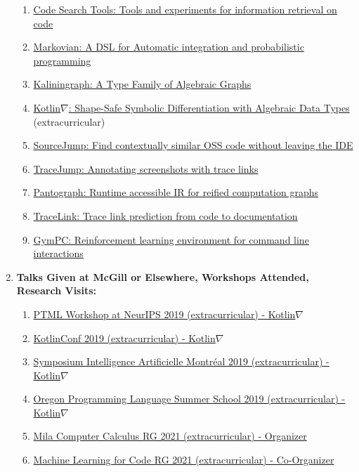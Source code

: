 \documentclass[11pt]{article}
\begin{document}
\begin{enumerate}
        \begin{enumerate}
            \item \href{https://github.com/breandan/gym-fs}{Code Search Tools: Tools and experiments for information retrieval on code}
            \item \href{https://github.com/breandan/markovian}{Markovian: A DSL for Automatic integration and probabilistic programming}
            \item \href{https://github.com/breandan/kaliningraph}{Kaliningraph: A Type Family of Algebraic Graphs}
            \item \href{https://github.com/breandan/kotlingrad}{Kotlin$\nabla$: Shape-Safe Symbolic Differentiation with Algebraic Data Types} (extracurricular)
            \item \href{https://github.com/acejump/sourcejump}{SourceJump: Find contextually similar OSS code without leaving the IDE}
            \item \href{https://github.com/acejump/tracejump}{TraceJump: Annotating screenshots with trace links}
            \item \href{https://github.com/breandan/pantograph}{Pantograph: Runtime accessible IR for reified computation graphs}
            \item \href{https://github.com/breandan/tracelink}{TraceLink: Trace link prediction from code to documentation}
            \item \href{https://github.com/breandan/gym-pc}{GymPC: Reinforcement learning environment for command line interactions}
        \end{enumerate}

        \item \textbf{Talks Given at McGill or Elsewhere, Workshops Attended, Research Visits:}

        \begin{enumerate}
            \item \href{https://program-transformations.github.io/}{PTML Workshop at NeurIPS 2019 (extracurricular) - Kotlin$\nabla$}
            \item \href{https://kotlinconf.com/2019/talks/}{KotlinConf 2019 (extracurricular) - Kotlin$\nabla$}
            \item \href{https://montrealaisymposium.wordpress.com/accepted-papers-2019/}{Symposium Intelligence Artificielle Montr\'eal 2019 (extracurricular) - Kotlin$\nabla$}
            \item \href{https://www.cs.uoregon.edu/research/summerschool/summer19/topics.php}{Oregon Programming Language Summer School 2019 (extracurricular) - Kotlin$\nabla$}
            \item \href{https://compcalc.github.io/}{Mila Computer Calculus RG 2021 (extracurricular) - Organizer}
            \item \href{https://ml4code-mtl.github.io/}{Machine Learning for Code RG 2021 (extracurricular) - Co-Organizer}
        \end{enumerate}


\end{enumerate}
\end{document}
